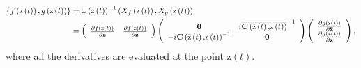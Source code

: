 \documentclass[aps,preprint]{revtex4}%
\begin{document}
\begin{align}
\left\{  f\left(  \mathrm{z}\left(  t\right)  \right)  ,g\left(
\mathrm{z}\left(  t\right)  \right)  \right\}    & =\omega\left(
\mathrm{z}\left(  t\right)  \right)  ^{-1}\left(  X_{f}\left(  \mathrm{z}%
\left(  t\right)  \right)  ,X_{g}\left(  \mathrm{z}\left(  t\right)  \right)
\right)  \nonumber\\
& =\left(
\begin{array}
[c]{cc}%
\frac{\partial f\left(  \mathrm{z}\left(  t\right)  \right)  }{\partial
\mathbf{\bar{z}}} & \frac{\partial f\left(  \mathrm{z}\left(  t\right)
\right)  }{\partial\mathbf{z}}%
\end{array}
\right)  \left(
\begin{array}
[c]{cc}%
\mathbf{0} & i\overline{\mathbf{C}\left(  \mathrm{\bar{z}}\left(  t\right)
\mathbf{,}\mathrm{z}\left(  t\right)  \right)  }^{-1}\\
-i\mathbf{C}\left(  \mathrm{\bar{z}}\left(  t\right)  \mathbf{,}%
\mathrm{z}\left(  t\right)  \right)  ^{-1} & \mathbf{0}%
\end{array}
\right)  \left(
\begin{array}
[c]{c}%
\frac{\partial g\left(  \mathrm{z}\left(  t\right)  \right)  }{\partial
\mathbf{\bar{z}}}\\
\frac{\partial g\left(  \mathrm{z}\left(  t\right)  \right)  }{\partial
\mathbf{z}}%
\end{array}
\right)  ,
\end{align}
where all the derivatives are evaluated at the point $\mathrm{z}\left(
t\right)  .$
\end{document}
